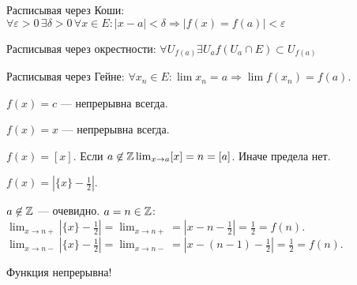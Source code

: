 \begin{definition}
    Расписывая через Коши:  $\forall \varepsilon > 0 \, \exists \delta > 0 \, \forall x \in E: |x-a| < \delta \Rightarrow |f(x) = f(a)| < \varepsilon$
\end{definition}
\begin{definition}
    Расписывая через окрестности: $\forall U_{f(a)} \exists U_a f(U_a \cap E) \subset U_{f(a)}$
\end{definition}
\begin{definition}
    Расписывая через Гейне: $\forall x_n \in E: \lim x_n = a \Rightarrow \lim f(x_n) = f(a)$.
\end{definition}
\begin{example}
    $f(x) = c$ --- непрерывна всегда.
\end{example}
\begin{example}
    $f(x) = x$ --- непрерывна всегда.
\end{example}
\begin{example}
    $f(x) = [x]$. Если  $a \not \in \mathbb{Z} \lim_{x\to a} [x] = n = [a]$. Иначе предела нет.
\end{example}
\begin{example}
    $f(x) = |\{x\} - \frac{1}{2}|$.

    $a \not \in \mathbb{Z}$ --- очевидно.
    $a = n \in \mathbb{Z}$:  $\lim_{x \to n+} |\{x\} - \frac{1}{2} | = \lim_{x \to n+} = |x-n-\frac{1}{2}| = \frac{1}{2} = f(n)$. $\lim_{x \to n-} |\{x\} - \frac{1}{2}| = \lim_{x\to n-} = |x-(n-1)-\frac{1}{2}| = \frac{1}{2} = f(n)$.

    Функция непрерывна!
\end{example}

